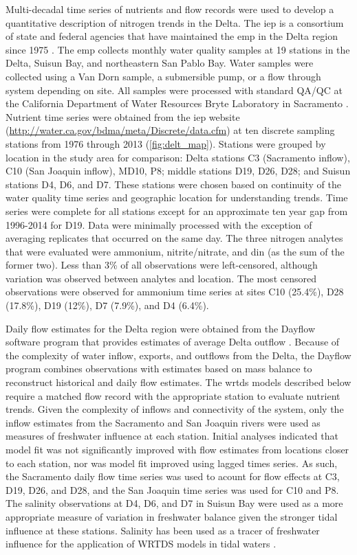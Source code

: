 \documentclass[journal = esthag, manuscript = article]{achemso}\usepackage[]{graphicx}\usepackage[]{color}
\begin{document}
Multi-decadal time series of nutrients and flow records were used to develop a quantitative description of nitrogen trends in the Delta.  The \ac{iep} is a consortium of state and federal agencies that have maintained the \ac{emp} in the Delta region since 1975 \cite{IEP13}.  The \ac{emp} collects monthly water quality samples at 19 stations in the Delta, Suisun Bay, and northeastern San Pablo Bay.  Water samples were collected using a Van Dorn sample, a submersible pump, or a flow through system depending on site.  All samples were processed with standard QA/QC at the California Department of Water Resources Bryte Laboratory in Sacramento \cite{IEP13}.  Nutrient time series were obtained from the \ac{iep} website (\url{http://water.ca.gov/bdma/meta/Discrete/data.cfm}) at ten discrete sampling stations from 1976 through 2013 (\cref{fig:delt_map}).  Stations were grouped by location in the study area for comparison: Delta stations C3 (Sacramento inflow), C10 (San Joaquin inflow), MD10, P8; middle stations D19, D26, D28; and Suisun stations D4, D6, and D7.  These stations were chosen based on continuity of the water quality time series and geographic location for understanding trends.  Time series were complete for all stations except for an approximate ten year gap from 1996-2014 for D19.  Data were minimally processed with the exception of averaging replicates that occurred on the same day.  The three nitrogen analytes that were evaluated were ammonium, nitrite/nitrate, and \ac{din} (as the sum of the former two). Less than 3\% of all observations were left-censored, although variation was observed between analytes and location.  The most censored observations were observed for ammonium time series at sites C10 (25.4\%), D28 (17.8\%), D19 (12\%), D7 (7.9\%), and D4 (6.4\%).

Daily flow estimates for the Delta region were obtained from the Dayflow software program that provides estimates of average Delta outflow \cite{IEP16}.  Because of the complexity of water inflow, exports, and outflows from the Delta, the Dayflow program combines observations with estimates based on mass balance to reconstruct historical and daily flow estimates.  The \ac{wrtds} models described below require a matched flow record with the appropriate station to evaluate nutrient trends. Given the complexity of inflows and connectivity of the system, only the inflow estimates from the Sacramento and San Joaquin rivers were used as measures of freshwater influence at each station.  Initial analyses indicated that model fit was not significantly improved with flow estimates from locations closer to each station, nor was model fit improved using lagged times series.  As such, the Sacramento daily flow time series was used to acount for flow effects at C3, D19, D26, and D28, and the San Joaquin time series was used for C10 and P8.  The salinity observations at D4, D6, and D7 in Suisun Bay were used as a more appropriate measure of variation in freshwater balance given the stronger tidal influence at these stations.  Salinity has been used as a tracer of freshwater influence for the application of WRTDS models in tidal waters \cite{Beck15}.  
\end{document}
